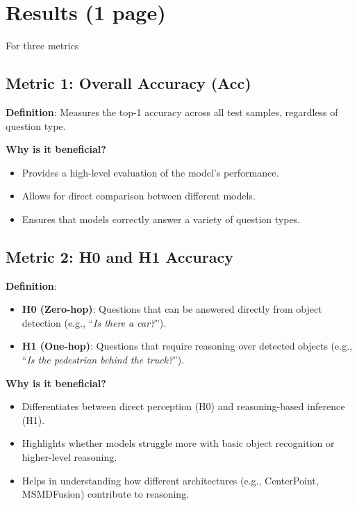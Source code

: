 \documentclass{article} %
\begin{document}
	
	\section{Results (1 page)}
	 For three metrics
	
	\subsection{Metric 1: Overall Accuracy (Acc)}
	\textbf{Definition}: Measures the top-1 accuracy across all test samples, regardless of question type.
	
	\textbf{Why is it beneficial?}
	\begin{itemize}
		\item Provides a high-level evaluation of the model’s performance.
		\item Allows for direct comparison between different models.
		\item Ensures that models correctly answer a variety of question types.
	\end{itemize}
	
	\subsection{Metric 2: H0 and H1 Accuracy}
	\textbf{Definition}:
	\begin{itemize}
		\item \textbf{H0 (Zero-hop)}: Questions that can be answered directly from object detection (e.g., “\textit{Is there a car?}”).
		\item \textbf{H1 (One-hop)}: Questions that require reasoning over detected objects (e.g., “\textit{Is the pedestrian behind the truck?}”).
	\end{itemize}
	
	\textbf{Why is it beneficial?}
	\begin{itemize}
		\item Differentiates between direct perception (H0) and reasoning-based inference (H1).
		\item Highlights whether models struggle more with basic object recognition or higher-level reasoning.
		\item Helps in understanding how different architectures (e.g., CenterPoint, MSMDFusion) contribute to reasoning.
	\end{itemize}
	
\end{document}
